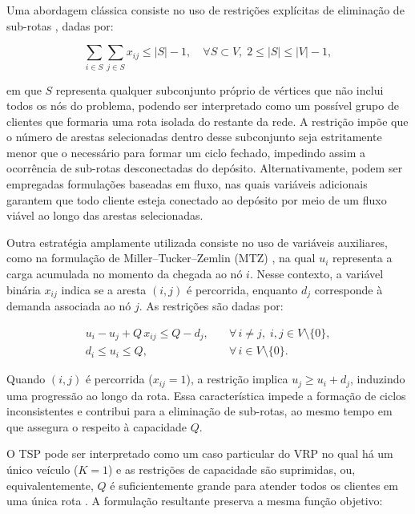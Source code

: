 Uma abordagem clássica consiste no uso de restrições explícitas de eliminação de sub-rotas \cite{dantzig2009solution}, dadas por:

\begin{equation}
\sum_{i \in S} \sum_{j \in S} x_{ij} \leq |S| - 1, 
\quad \forall S \subset V,\; 2 \leq |S| \leq |V|-1,
\end{equation}

\noindent em que \(S\) representa qualquer subconjunto próprio de vértices que não inclui todos os nós do problema, podendo ser interpretado como um possível grupo de clientes que formaria uma rota isolada do restante da rede. A restrição impõe que o número de arestas selecionadas dentro desse subconjunto seja estritamente menor que o necessário para formar um ciclo fechado, impedindo assim a ocorrência de sub-rotas desconectadas do depósito. Alternativamente, podem ser empregadas formulações baseadas em fluxo, nas quais variáveis adicionais garantem que todo cliente esteja conectado ao depósito por meio de um fluxo viável ao longo das arestas selecionadas.

Outra estratégia amplamente utilizada consiste no uso de variáveis auxiliares, como na formulação de Miller--Tucker--Zemlin (MTZ) \cite{miller1960integer}, na qual $u_i$ representa a carga acumulada no momento da chegada ao nó $i$. Nesse contexto, a variável binária $x_{ij}$ indica se a aresta $(i,j)$ é percorrida, enquanto $d_j$ corresponde à demanda associada ao nó $j$. As restrições são dadas por:

\begin{eqnarray}
u_i - u_j + Q\, x_{ij} \leq Q - d_j, & \quad \forall\, i \neq j,\; i,j \in V \setminus \{0\}, \\[4pt]
d_i \leq u_i \leq Q, & \quad \forall\, i \in V \setminus \{0\}.
\end{eqnarray}

Quando $(i,j)$ é percorrida ($x_{ij}=1$), a restrição implica $u_j \geq u_i + d_j$, induzindo uma progressão ao longo da rota. Essa característica impede a formação de ciclos inconsistentes e contribui para a eliminação de sub-rotas, ao mesmo tempo em que assegura o respeito à capacidade $Q$.

O TSP pode ser interpretado como um caso particular do VRP no qual há um único veículo ($K = 1$) \cite{toth2002vehicle} e as restrições de capacidade são suprimidas, ou, equivalentemente, $Q$ é suficientemente grande para atender todos os clientes em uma única rota \cite{balinski1964integer, eilon1974distribution}. A formulação resultante preserva a mesma função objetivo:

